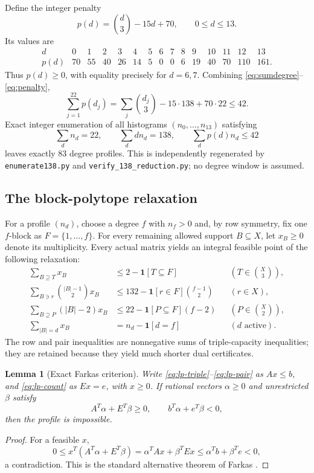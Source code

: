 \documentclass[10pt,a4paper]{amsart}
\newtheorem{lemma}[theorem]{Lemma}
\begin{document}
Define the integer penalty
\begin{equation}\label{eq:penalty}
  p(d)=\binom d3-15d+70,\qquad 0\le d\le13.
\end{equation}
Its values are
\[
\begin{array}{c|rrrrrrrrrrrrrr}
d&0&1&2&3&4&5&6&7&8&9&10&11&12&13\\\hline
p(d)&70&55&40&26&14&5&0&0&6&19&40&70&110&161.
\end{array}
\]
Thus $p(d)\ge0$, with equality precisely for $d=6,7$. Combining \eqref{eq:sumdegree}--\eqref{eq:penalty},
\begin{equation}\label{eq:penaltybudget}
  \sum_{j=1}^{22}p(d_j)
  =\sum_j\binom{d_j}{3}-15\cdot138+70\cdot22
  \le42.
\end{equation}
Exact integer enumeration of all histograms $(n_0,\dots,n_{13})$ satisfying
\[
  \sum_dn_d=22,
  \qquad \sum_ddn_d=138,
  \qquad \sum_dp(d)n_d\le42
\]
leaves exactly $83$ degree profiles. This is independently regenerated by \texttt{enumerate138.py} and \texttt{verify\_138\_reduction.py}; no degree window is assumed.

\subsection{The block-polytope relaxation}
For a profile $(n_d)$, choose a degree $f$ with $n_f>0$ and, by row symmetry, fix one $f$-block as $F=\{1,\dots,f\}$. For every remaining allowed support $B\subseteq X$, let $x_B\ge0$ denote its multiplicity. Every actual matrix yields an integral feasible point of the following relaxation:
\begin{align}
 \sum_{B\supseteq T}x_B
 &\le2-\mathbf1[T\subseteq F]
 &&(T\in\binom X3), \label{eq:lp-triple}\\
 \sum_{B\ni r}\binom{|B|-1}{2}x_B
 &\le132-\mathbf1[r\in F]\binom{f-1}{2}
 &&(r\in X), \label{eq:lp-row}\\
 \sum_{B\supseteq P}(|B|-2)x_B
 &\le22-\mathbf1[P\subseteq F](f-2)
 &&(P\in\binom X2), \label{eq:lp-pair}\\
 \sum_{|B|=d}x_B
 &=n_d-\mathbf1[d=f]
 &&(d\text{ active}). \label{eq:lp-count}
\end{align}
The row and pair inequalities are nonnegative sums of triple-capacity inequalities; they are retained because they yield much shorter dual certificates.

\begin{lemma}[Exact Farkas criterion]\label{lem:farkas}
Write \eqref{eq:lp-triple}--\eqref{eq:lp-pair} as $Ax\le b$, and \eqref{eq:lp-count} as $Ex=e$, with $x\ge0$. If rational vectors $\alpha\ge0$ and unrestricted $\beta$ satisfy
\[
 A^T\alpha+E^T\beta\ge0,
 \qquad b^T\alpha+e^T\beta<0,
\]
then the profile is impossible.
\end{lemma}
\begin{proof}
For a feasible $x$,
\[
0\le x^T(A^T\alpha+E^T\beta)
=\alpha^TAx+\beta^TEx
\le\alpha^Tb+\beta^Te<0,
\]
a contradiction. This is the standard alternative theorem of Farkas \cite{Farkas1902}.
\end{proof}
\end{document}
